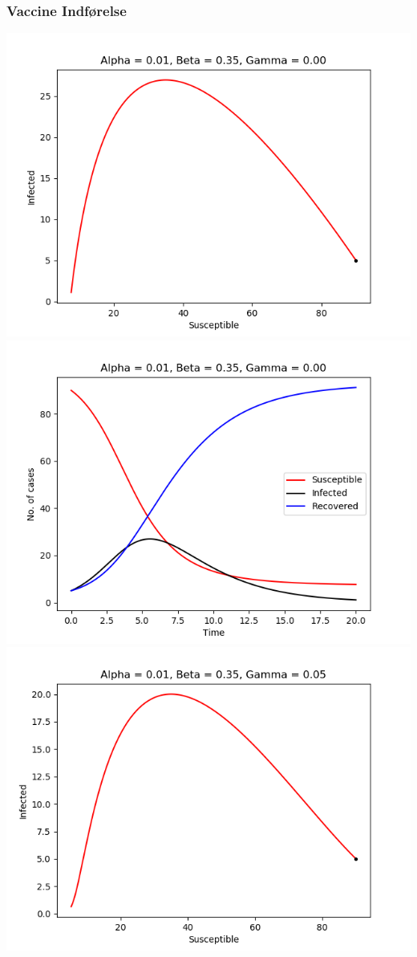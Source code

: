 \begin{frame}
\frametitle{Vaccine Indførelse}
\includegraphics[scale=0.295]{fig/img/a1_b35_g0.png}
\includegraphics[scale=0.295]{fig/img/t_a1_b35_g0.png}
%
\includegraphics[scale=0.295]{img/a1_b35_g5.png}

\end{frame}
